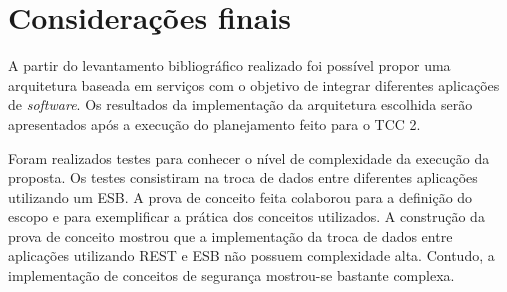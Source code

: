\chapter[Considerações finais]{Considerações finais}

A partir do levantamento bibliográfico realizado foi possível propor uma arquitetura baseada em serviços com o objetivo de integrar diferentes aplicações de \textit{software}. Os resultados da implementação da arquitetura escolhida serão apresentados após a execução do planejamento feito para o TCC 2.

Foram realizados testes para conhecer o nível de complexidade da execução da proposta. Os testes consistiram na troca de dados entre diferentes aplicações utilizando um ESB. A prova de conceito feita colaborou para a definição do escopo e para exemplificar a prática dos conceitos utilizados. A construção da prova de conceito mostrou que a implementação da troca de dados entre aplicações utilizando REST e ESB não possuem complexidade alta. Contudo, a implementação de conceitos de segurança mostrou-se bastante complexa.